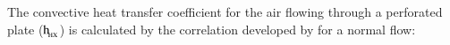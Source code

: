 
%

%
%
%
%
%
%
%

The convective heat transfer coefficient for the air flowing through a perforated plate ($\rm{h_{\!_{HX}}}$) is calculated by the correlation developed by \citet{Kutscher1994} for a normal flow:

